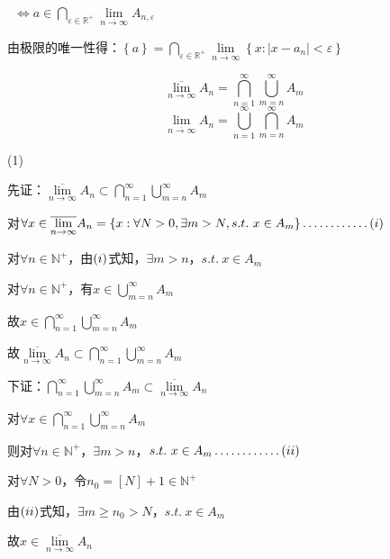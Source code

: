 \par \ $\Leftrightarrow$$a \in \bigcap \limits_{\varepsilon \in \mathbb{R}^{+}} \lim \limits_{\overline{n \to \infty}}A_{n,\varepsilon }$
\par 由极限的唯一性得：$\left\{a\right\} = \bigcap \limits_{\varepsilon \in \mathbb{R}^{+}} \lim \limits_{\overline{n \to \infty}}\left\{x : \left\lvert x - a_{n} \right\rvert < \varepsilon \right\} $
\begin{td}
\[\overline{\lim \limits_{n \to \infty}}A_{n} = \bigcap \limits_{n=1}^{\infty}\bigcup \limits_{m=n}^{\infty}A_{m}\]
\[\lim \limits_{\overline{n \to \infty}}A_{n} = \bigcup \limits_{n=1}^{\infty}\bigcap \limits_{m=n}^{\infty}A_{m}\]
\end{td}
\noindent (1)
\par {} 先证：$\overline{\lim \limits_{n \to \infty}}A_{n} \subset  \bigcap \limits_{n=1}^{\infty}\bigcup \limits_{m=n}^{\infty}A_{m}$
\par \quad 对$\forall x \in \overline{\lim \limits_{n \to \infty}}A_{n} = \left\{x : \forall N > 0,\exists m > N,s.t. \ x \in A_{m}\right\} \dots \dots \dots \dots(\romannumeral1)$
\par \quad 对$\forall n \in \mathbb{N}^{+}$，由$(\romannumeral1)$式知，$\exists m > n$，$s.t. \ x \in A_{m}$
\par \quad 对$\forall n \in \mathbb{N}^{+}$，有$x \in \bigcup \limits_{m=n}^{\infty}A_{m}$
\par \quad 故$x \in \bigcap \limits_{n=1}^{\infty}\bigcup \limits_{m=n}^{\infty}A_{m}$
\par \quad 故$\overline{\lim \limits_{n \to \infty}}A_{n} \subset  \bigcap \limits_{n=1}^{\infty}\bigcup \limits_{m=n}^{\infty}A_{m}$
\par {} 下证：$ \bigcap \limits_{n=1}^{\infty}\bigcup \limits_{m=n}^{\infty}A_{m} \subset \overline{\lim \limits_{n \to \infty}}A_{n}$
\par \quad 对$\forall x \in \bigcap \limits_{n=1}^{\infty}\bigcup \limits_{m=n}^{\infty}A_{m}$
\par \quad 则对$\forall n \in \mathbb{N}^{+}$，$\exists m > n$，$s.t. \ x \in A_{m} \dots \dots \dots \dots(\romannumeral2)$
\par \quad 对$\forall N > 0$，令$n_{0} = \left[N\right] + 1 \in \mathbb{N}^{+} $
\par \quad 由$(\romannumeral2)$式知，$\exists m \geqslant n_{0} > N$，$s.t. \ x \in A_{m}$
\par \quad 故$x \in \overline{\lim \limits_{n \to \infty}}A_{n}$
$$
